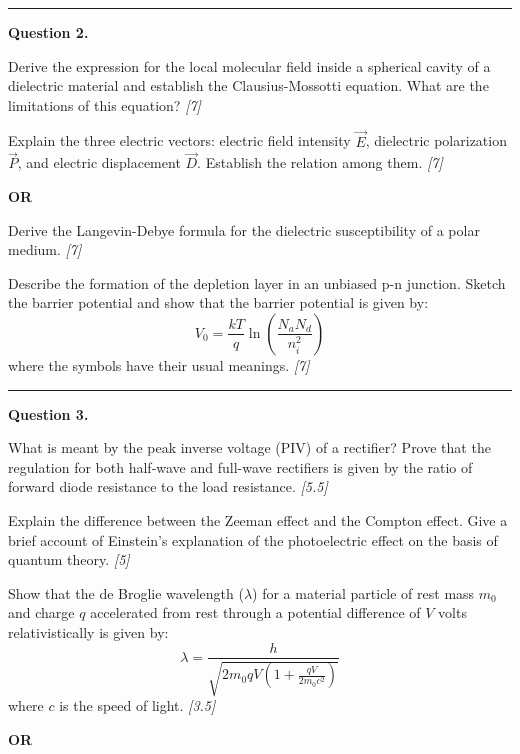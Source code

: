 \documentclass[11pt,a4paper]{article}
\newcommand{\pts}[1]{\hfill   \textit{[#1]}}
\begin{document}
\medskip\rule{\linewidth}{0.2pt}

\medskip


\noindent   \textbf{Question 2.}

\begin{parts}
  \item Derive the expression for the local molecular field inside a spherical cavity of a dielectric material and establish the Clausius-Mossotti equation. What are the limitations of this equation? \pts{7}
  \item Explain the three electric vectors: electric field intensity $\vec{E}$, dielectric polarization $\vec{P}$, and electric displacement $\vec{D}$. Establish the relation among them. \pts{7}
\end{parts}
\hfill   \textbf{OR}

\begin{parts}
  \item Derive the Langevin-Debye formula for the dielectric susceptibility of a polar medium. \pts{7}
  \item Describe the formation of the depletion layer in an unbiased p-n junction. Sketch the barrier potential and show that the barrier potential is given by:
  \[
  V_0 = \frac{kT}{q} \ln \left( \frac{N_a N_d}{n_i^2} \right)
  \]
  where the symbols have their usual meanings. \pts{7}
\end{parts}

\medskip\rule{\linewidth}{0.2pt}

\medskip


\noindent   \textbf{Question 3.}

\begin{parts}
  \item What is meant by the peak inverse voltage (PIV) of a rectifier? Prove that the regulation for both half-wave and full-wave rectifiers is given by the ratio of forward diode resistance to the load resistance. \pts{5.5}
  \item Explain the difference between the Zeeman effect and the Compton effect. Give a brief account of Einstein's explanation of the photoelectric effect on the basis of quantum theory. \pts{5}
  \item Show that the de Broglie wavelength ($\lambda$) for a material particle of rest mass $m_0$ and charge $q$ accelerated from rest through a potential difference of $V$ volts relativistically is given by:
  \[
  \lambda = \frac{h}{\sqrt{2 m_0 q V \left(1 + \frac{q V}{2 m_0 c^2}\right)}}
  \]
  where $c$ is the speed of light. \pts{3.5}
\end{parts}
\hfill   \textbf{OR}
\end{document}
